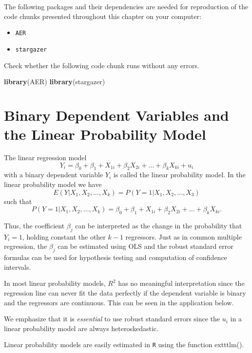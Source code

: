 \documentclass[]{book}
\newenvironment{Shaded}{\begin{snugshade}}{\end{snugshade}}
\newcommand{\KeywordTok}[1]{\textcolor[rgb]{0.13,0.29,0.53}{\textbf{#1}}}
\newcommand{\NormalTok}[1]{#1}
\providecommand{\tightlist}{%
  \setlength{\itemsep}{0pt}\setlength{\parskip}{0pt}}
\theoremstyle{definition}
\theoremstyle{definition}
\theoremstyle{definition}
\theoremstyle{remark}
\begin{document}
The following packages and their dependencies are needed for
reproduction of the code chunks presented throughout this chapter on
your computer:

\begin{itemize}
\tightlist
\item
  \texttt{AER}
\item
  \texttt{stargazer}
\end{itemize}

Check whether the following code chunk runs without any errors.

\begin{Shaded}
\begin{Highlighting}[]
\KeywordTok{library}\NormalTok{(AER)}
\KeywordTok{library}\NormalTok{(stargazer)}
\end{Highlighting}
\end{Shaded}

\section{Binary Dependent Variables and the Linear Probability
Model}\label{binary-dependent-variables-and-the-linear-probability-model}

\begin{keyconcepts}{11.1}
The linear regression model 
$$Y_i = \beta_0 + \beta_1 + X_{1i} + \beta_2 X_{2i} + \dots + \beta_k X_{ki} + u_i$$
with a binary dependent variable $Y_i$ is called the linear probability model. In the linear probability model we have $$E(Y\vert X_1,X_2,\dots,X_k) = P(Y=1\vert X_1, X_2,\dots, X_3)$$ such that $$ P(Y = 1 \vert X_1, X_2, \dots, X_k) = \beta_0 + \beta_1 + X_{1i} + \beta_2 X_{2i} + \dots + \beta_k X_{ki}.$$\newline

Thus, the coefficient $\beta_j$ can be interpreted as the change in the probability that $Y_i=1$, holding constant the other $k-1$ regressors. Just as in common multiple regression, the $\beta_j$ can be estimated using OLS and the robust standard error formulas can be used for hypothesis testing and computation of confidence intervals.\newline 

In most linear probability models, $R^2$ has no meaningful interpretation since the regression line can never fit the data perfectly if the dependent variable is binary and the regressors are continuous. This can be seen in the application below.\newline

We emphasize that it is \textit{essential} to use robust standard errors since the $u_i$ in a linear probability model are always heteroskedastic.\newline

Linear probability models are easily estimated in \texttt{R} using the function exttt{lm()}.
\end{keyconcepts}
\end{document}
